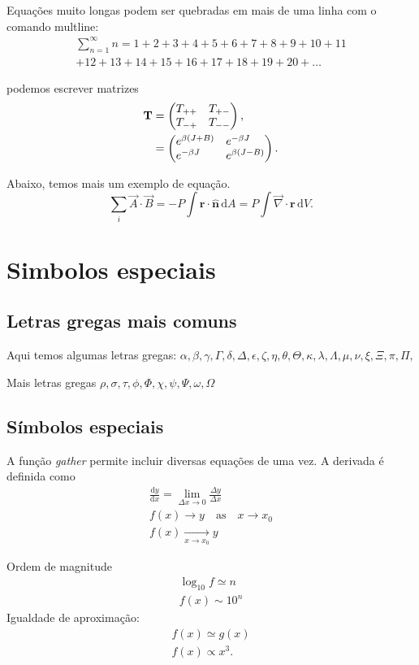 \documentclass[portuguese,brazilian,12pt,final]{article}
\begin{document}
Equações muito longas podem ser quebradas em mais de uma linha com o comando multline:
%
\begin{multline}
\label{Eq:Eq3}
\sum_{n=1}^{\infty} n = 1+2+3+4+5+6+7+8+9+10+11
\\
+12+13+14+15+16+17+18+19+20+\dots
\end{multline}


podemos escrever matrizes
%
\begin{align}
\textbf{T} &=
\begin{pmatrix}
T_{++} \hfill & T_{+-} \\
T_{-+} & T_{--} \hfill
\end{pmatrix} , \nonumber \\
& =
\begin{pmatrix}
e^{\beta (J + B)} \hfill & e^{-\beta J} \hfill \\
e^{-\beta J} \hfill & e^{\beta (J - B)} \hfill
\end{pmatrix}.
\end{align}

Abaixo, temos mais um exemplo de equação.
%
\newcommand{\rv}{\textbf{r}}
\begin{equation}
\sum_i \vec A \cdot \vec B = -P\!\int\! \rv \cdot
\hat{\mathbf{n}} \, \mathrm{d} A = P\!\int \! {\vec \nabla} \cdot \rv \, \mathrm{d} V.
\end{equation}



\section{Simbolos especiais}

\subsection{Letras gregas mais comuns}

Aqui temos algumas letras gregas:
$\alpha,
\beta, \gamma, \Gamma,
\delta,\Delta,
\epsilon, \zeta, \eta, \theta, \Theta, \kappa,
\lambda, \Lambda, \mu, \nu,
\xi, \Xi,
\pi, \Pi,$

Mais letras gregas
$
\rho,
\sigma,
\tau,
\phi, \Phi,
\chi,
\psi, \Psi,
\omega, \Omega$

\subsection{Símbolos especiais}

A função \emph{gather} permite incluir diversas equações de uma vez. A derivada é definida como
%
\begin{gather}
\frac{\mathrm{d}y}{\mathrm{d}x} = \lim_{\Delta x \to 0} \frac{\Delta y}
{\Delta x}
\\
f(x) \to y \quad \mbox{as} \quad x \to
x_{0}
\\
f(x) \mathop {\longrightarrow}
\limits_{x \to x_0} y
\end{gather}

Ordem de magnitude
%
\begin{gather}
\log_{10}f \simeq n
\\
f(x)\sim 10^{n}
\end{gather}
Igualdade de aproximação:
\begin{gather}
f(x)\simeq g(x)
\\
f(x) \propto x^3 .
\end{gather}
\end{document}
